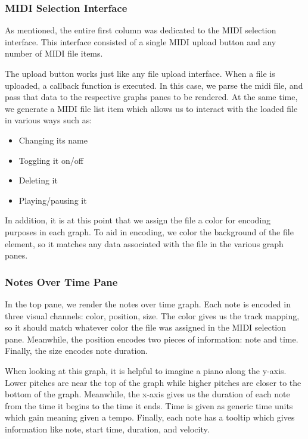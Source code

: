 \documentclass[journal]{vgtc}                %
\begin{document}
\subsubsection{MIDI Selection Interface}

As mentioned, the entire first column was dedicated to the MIDI selection
interface. This interface consisted of a single MIDI upload button and any
number of MIDI file items.

The upload button works just like any file upload interface. When a file is
uploaded, a callback function is executed. In this case, we parse the midi file,
and pass that data to the respective graphs panes to be rendered. At the same
time, we generate a MIDI file list item which allows us to interact with the
loaded file in various ways such as:

\begin{itemize}
  \item Changing its name
  \item Toggling it on/off
  \item Deleting it
  \item Playing/pausing it
\end{itemize}

In addition, it is at this point that we assign the file a color for encoding
purposes in each graph. To aid in encoding, we color the background of the
file element, so it matches any data associated with the file in the various
graph panes.

\subsubsection{Notes Over Time Pane}

In the top pane, we render the notes over time graph. Each note is encoded in
three visual channels: color, position, size. The color gives us the track
mapping, so it should match whatever color the file was assigned in the MIDI
selection pane. Meanwhile, the position encodes two pieces of information:
note and time. Finally, the size encodes note duration.

When looking at this graph, it is helpful to imagine a piano along the y-axis.
Lower pitches are near the top of the graph while higher pitches are closer to the
bottom of the graph. Meanwhile, the x-axis gives us the duration of each note
from the time it begins to the time it ends. Time is given as generic time units
which gain meaning given a tempo. Finally, each note has a tooltip which gives
information like note, start time, duration, and velocity.
\end{document}
